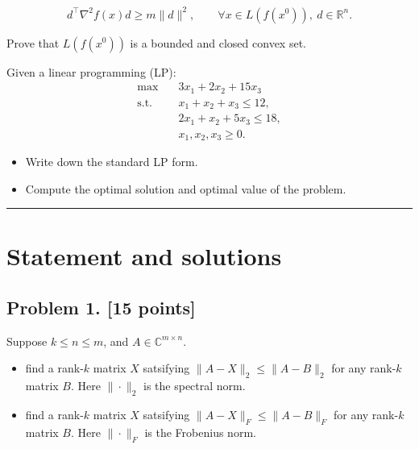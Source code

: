 \documentclass[11pt,a4paper]{article}
\newcommand{\examstatement}[1]{%
  \par\addvspace{0.85em}%
  \noindent{\bfseries #1}\par\nobreak\addvspace{0.28em}%
}
\begin{document}
\[
d^{\top} \nabla^{2} f(x) d \ge m \|d\|^{2}, \qquad \forall x \in L(f(x^{0})),\ d \in \mathbb{R}^{n}.
\]

Prove that \(L(f(x^{0}))\) is a bounded and closed convex set.

\examstatement{Problem 7. [10 points]}
Given a linear programming (LP):
\begin{align*}
\max\quad & 3x_{1} + 2x_{2} + 15x_{3} \\
\text{s.t.}\quad & x_{1} + x_{2} + x_{3} \le 12, \\
& 2x_{1} + x_{2} + 5x_{3} \le 18, \\
& x_{1}, x_{2}, x_{3} \ge 0.
\end{align*}
\begin{itemize}
    \item Write down the standard LP form.
    \item Compute the optimal solution and optimal value of the problem.
\end{itemize}

\noindent\rule{\linewidth}{0.4pt}

\section{Statement and solutions}

\subsection{Problem 1. [15 points]}
Suppose \(k \leqslant n \leqslant m\), and \(A \in \mathbb{C}^{m \times n}\).
\begin{itemize}
    \item find a rank-\(k\) matrix \(X\) satsifying \(\|A - X\|_{2} \leqslant \|A - B\|_{2}\) for any rank-\(k\) matrix \(B\). Here \(\|\cdot\|_{2}\) is the spectral norm.
    \item find a rank-\(k\) matrix \(X\) satsifying \(\|A - X\|_{F} \leqslant \|A - B\|_{F}\) for any rank-\(k\) matrix \(B\). Here \(\|\cdot\|_{F}\) is the Frobenius norm.
\end{itemize}
\end{document}
